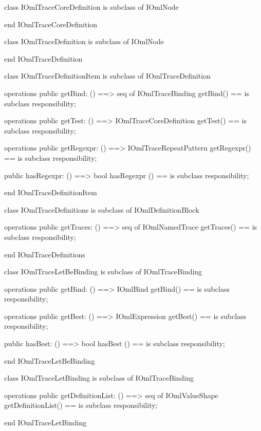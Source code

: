 \begin{vdm_al}
class IOmlTraceCoreDefinition
 is subclass of IOmlNode

end IOmlTraceCoreDefinition
\end{vdm_al}

\begin{vdm_al}
class IOmlTraceDefinition
 is subclass of IOmlNode

end IOmlTraceDefinition
\end{vdm_al}

\begin{vdm_al}
class IOmlTraceDefinitionItem
 is subclass of IOmlTraceDefinition

operations
  public getBind: () ==> seq of IOmlTraceBinding
  getBind() == is subclass responsibility;

operations
  public getTest: () ==> IOmlTraceCoreDefinition
  getTest() == is subclass responsibility;

operations
  public getRegexpr: () ==> IOmlTraceRepeatPattern
  getRegexpr() == is subclass responsibility;

  public hasRegexpr: () ==> bool
  hasRegexpr () == is subclass responsibility;

end IOmlTraceDefinitionItem
\end{vdm_al}

\begin{vdm_al}
class IOmlTraceDefinitions
 is subclass of IOmlDefinitionBlock

operations
  public getTraces: () ==> seq of IOmlNamedTrace
  getTraces() == is subclass responsibility;

end IOmlTraceDefinitions
\end{vdm_al}

\begin{vdm_al}
class IOmlTraceLetBeBinding
 is subclass of IOmlTraceBinding

operations
  public getBind: () ==> IOmlBind
  getBind() == is subclass responsibility;

operations
  public getBest: () ==> IOmlExpression
  getBest() == is subclass responsibility;

  public hasBest: () ==> bool
  hasBest () == is subclass responsibility;

end IOmlTraceLetBeBinding
\end{vdm_al}

\begin{vdm_al}
class IOmlTraceLetBinding
 is subclass of IOmlTraceBinding

operations
  public getDefinitionList: () ==> seq of IOmlValueShape
  getDefinitionList() == is subclass responsibility;

end IOmlTraceLetBinding
\end{vdm_al}

